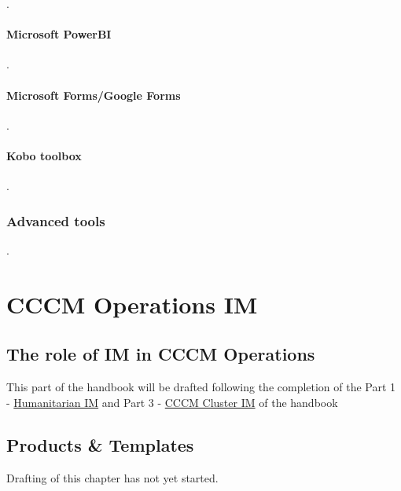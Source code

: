 \documentclass[
  a4paper,
  onecolumn,
  oneside]{book}
\begin{document}
.

\hypertarget{microsoft-powerbi}{%
\subsection{Microsoft PowerBI}\label{microsoft-powerbi}}

.

\hypertarget{microsoft-formsgoogle-forms}{%
\subsection{Microsoft Forms/Google
Forms}\label{microsoft-formsgoogle-forms}}

.

\hypertarget{kobo-toolbox}{%
\subsection{Kobo toolbox}\label{kobo-toolbox}}

.

\hypertarget{advanced-tools}{%
\section{Advanced tools}\label{advanced-tools}}

.

\part{CCCM Operations IM}

\hypertarget{the-role-of-im-in-cccm-operations}{%
\chapter{The role of IM in CCCM
Operations}\label{the-role-of-im-in-cccm-operations}}

This part of the handbook will be drafted following the completion of
the Part 1 -
\href{https://imhandbook.cccmcluster.org/part1/data-literacy.html}{Humanitarian
IM} and Part 3 -
\href{https://imhandbook.cccmcluster.org/part3/cluster.html}{CCCM
Cluster IM} of the handbook

\hypertarget{products-templates}{%
\chapter{Products \& Templates}\label{products-templates}}

\begin{tcolorbox}[enhanced jigsaw, colframe=quarto-callout-warning-color-frame, title=\textcolor{quarto-callout-warning-color}{\faExclamationTriangle}\hspace{0.5em}{Warning}, toptitle=1mm, toprule=.15mm, colbacktitle=quarto-callout-warning-color!10!white, breakable, arc=.35mm, coltitle=black, bottomrule=.15mm, titlerule=0mm, opacityback=0, rightrule=.15mm, bottomtitle=1mm, leftrule=.75mm, left=2mm, opacitybacktitle=0.6, colback=white]

Drafting of this chapter has not yet started.

\end{tcolorbox}
\end{document}
